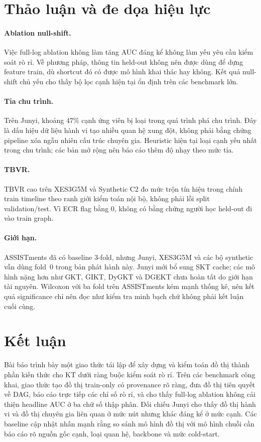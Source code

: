 \documentclass[runningheads]{llncs}
\newcommand{\KC}{thành phần kiến thức}
\begin{document}
\section{Thảo luận và đe dọa hiệu lực}
\paragraph{Ablation null-shift.}
Việc full-log ablation không làm tăng AUC đáng kể không làm yếu yêu cầu kiểm soát rò rỉ. Về phương pháp, thông tin held-out không nên được dùng để dựng feature train, dù shortcut đó có được mô hình khai thác hay không. Kết quả null-shift chủ yếu cho thấy bộ lọc cạnh hiện tại ổn định trên các benchmark lớn.

\paragraph{Tỉa chu trình.}
Trên Junyi, khoảng $47\%$ cạnh ứng viên bị loại trong quá trình phá chu trình. Đây là dấu hiệu dữ liệu hành vi tạo nhiều quan hệ xung đột, không phải bằng chứng pipeline xóa ngẫu nhiên cấu trúc chuyên gia. Heuristic hiện tại loại cạnh yếu nhất trong chu trình; các bản mở rộng nên báo cáo thêm độ nhạy theo mức tỉa.

\paragraph{TBVR.}
TBVR cao trên XES3G5M và Synthetic C2 đo mức trộn tín hiệu trong chính train timeline theo ranh giới kiểm toán nội bộ, không phải lỗi split validation/test. Vì ECR flag bằng $0$, không có bằng chứng người học held-out đi vào train graph.

\paragraph{Giới hạn.}
ASSISTments đã có baseline 3-fold, nhưng Junyi, XES3G5M và các bộ synthetic vẫn dùng fold~0 trong bản phát hành này. Junyi mới bổ sung SKT cache; các mô hình nặng hơn như GKT, GIKT, DyGKT và DGEKT chưa hoàn tất do giới hạn tài nguyên. Wilcoxon với ba fold trên ASSISTments kém mạnh thống kê, nên kết quả significance chỉ nên đọc như kiểm tra minh bạch chứ không phải kết luận cuối cùng.

\section{Kết luận}
Bài báo trình bày một giao thức tái lập để xây dựng và kiểm toán đồ thị \KC{} cho KT dưới ràng buộc kiểm soát rò rỉ. Trên các benchmark công khai, giao thức tạo đồ thị train-only có provenance rõ ràng, đưa đồ thị tiên quyết về DAG, báo cáo trực tiếp các chỉ số rò rỉ, và cho thấy full-log ablation không cải thiện headline AUC ở ba chữ số thập phân. Đối chiếu Junyi cho thấy đồ thị hành vi và đồ thị chuyên gia liên quan ở mức nút nhưng khác đáng kể ở mức cạnh. Các baseline cập nhật nhấn mạnh rằng so sánh mô hình đồ thị với mô hình chuỗi cần báo cáo rõ nguồn gốc cạnh, loại quan hệ, backbone và mức cold-start.
\end{document}
